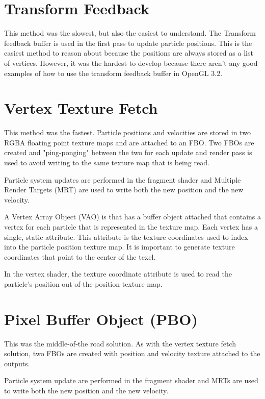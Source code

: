 \documentclass{article}
\begin{document}
\section{Transform Feedback}

This method was the slowest, but also the easiest to understand. The Transform feedback
buffer is used in the first pass to update particle positions. This is
the easiest method to reason about because the positions are 
always stored as a list of vertices. However, it was the hardest
to develop because there aren't any good examples of how to use
the transform feedback buffer in OpenGL 3.2. 

\section{Vertex Texture Fetch}

This method was the fastest. Particle positions and velocities
are stored in two RGBA floating point texture maps and are
attached to an FBO. Two FBOs are created and "ping-ponging" between
the two for each update and render pass is used to avoid writing
to the same texture map that is being read.

Particle system updates are performed in the fragment shader and 
Multiple Render Targets (MRT) are used to write both the new position
and the new velocity.

A Vertex Array Object (VAO) is that has a buffer object attached
that contains a vertex for each particle that is represented in the
texture map. Each vertex has a single, static attribute. This attribute
is the texture coordinates used to index into the particle position
texture map. It is important to generate texture coordinates that
point to the center of the texel.

In the vertex shader, the texture coordinate attribute is used
to read the particle's position out of the position texture map.

\section{Pixel Buffer Object (PBO)}

This was the middle-of-the road solution. As with the vertex
texture fetch solution, two FBOs are created with position
and velocity texture attached to the outputs. 


Particle system update are performed in the fragment shader and
MRTs are used to write both the new position and the new velocity.
\end{document}
